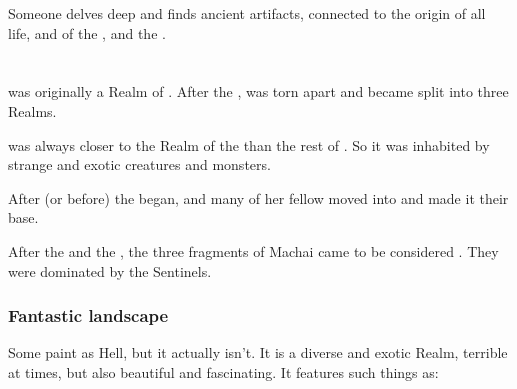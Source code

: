 
Someone delves deep and finds ancient \voyager{} artifacts, connected to the origin of all life, and of the , and the . 
















\section{\Machai}
\index{\Machai}
\Machai was originally a Realm of \Miith. 
After the , \Machai was torn apart and became split into three Realms. 

\Machai was always closer to the Realm of the \xss than the rest of \Miith. 
So it was inhabited by strange and exotic creatures and monsters. 

After (or before) the  began, \Tiamat and many of her fellow \dragons moved into \Machai and made it their base. 

After the \secondbanewar and the \Shrouding, the three fragments of Machai came to be considered . 
They were dominated by the Sentinels. 









\subsubsection{Fantastic landscape}
Some  paint \Machai{} as Hell, but it actually isn't. 
It is a diverse and exotic Realm, terrible at times, but also beautiful and fascinating. 
It features such things as:

